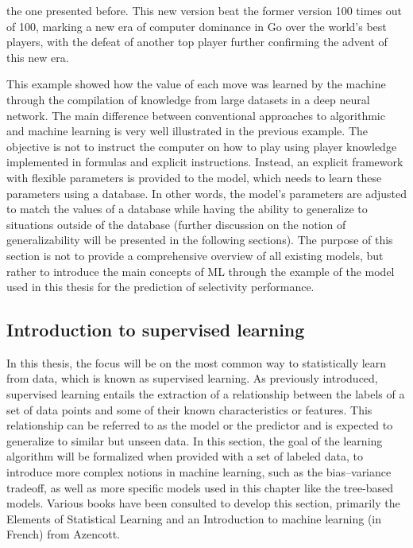 \documentclass[main]{subfiles}
\begin{document}
the one presented before. This new version beat the former version 100 times out of 100,\autocite{Silver_2017} marking a new era of computer dominance in Go over the world's best players, with the defeat of another top player further confirming the advent of this new era.

This example showed how the value of each move was learned by the machine through the compilation of knowledge from large datasets in a deep neural network. The main difference between conventional approaches to algorithmic and machine learning is very well illustrated in the previous example. The objective is not to instruct the computer on how to play using player knowledge implemented in formulas and explicit instructions. Instead, an explicit framework with flexible parameters is provided to the model, which needs to learn these parameters using a database. In other words, the model's parameters are adjusted to match the values of a database while having the ability to generalize to situations outside of the database (further discussion on the notion of generalizability will be presented in the following sections). The purpose of this section is not to provide a comprehensive overview of all existing models, but rather to introduce the main concepts of ML through the example of the model used in this thesis for the prediction of selectivity performance.

\subsection{Introduction to supervised learning}

In this thesis, the focus will be on the most common way to statistically learn from data, which is known as supervised learning. As previously introduced, supervised learning entails the extraction of a relationship between the labels of a set of data points and some of their known characteristics or features. This relationship can be referred to as the model or the predictor and is expected to generalize to similar but unseen data. In this section, the goal of the learning algorithm will be formalized when provided with a set of labeled data, to introduce more complex notions in machine learning, such as the bias--variance tradeoff, as well as more specific models used in this chapter like the tree-based models. Various books have been consulted to develop this section, primarily the Elements of Statistical Learning\autocite{Hastie_2009} and an Introduction to machine learning (in French) from Azencott\autocite{azencott2022introduction}.
\end{document}
